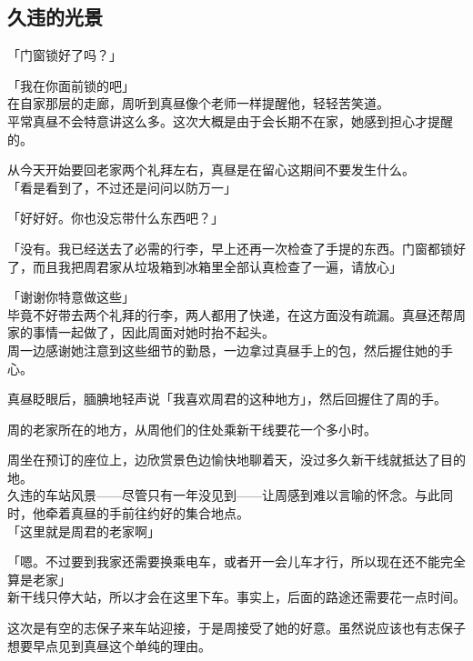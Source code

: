 \subsection{久违的光景}

「门窗锁好了吗？」

「我在你面前锁的吧」\\

在自家那层的走廊，周听到真昼像个老师一样提醒他，轻轻苦笑道。\\

平常真昼不会特意讲这么多。这次大概是由于会长期不在家，她感到担心才提醒的。

从今天开始要回老家两个礼拜左右，真昼是在留心这期间不要发生什么。\\

「看是看到了，不过还是问问以防万一」

「好好好。你也没忘带什么东西吧？」

「没有。我已经送去了必需的行李，早上还再一次检查了手提的东西。门窗都锁好了，而且我把周君家从垃圾箱到冰箱里全部认真检查了一遍，请放心」

「谢谢你特意做这些」\\

毕竟不好带去两个礼拜的行李，两人都用了快递，在这方面没有疏漏。真昼还帮周家的事情一起做了，因此周面对她时抬不起头。\\

周一边感谢她注意到这些细节的勤恳，一边拿过真昼手上的包，然后握住她的手心。

真昼眨眼后，腼腆地轻声说「我喜欢周君的这种地方」，然后回握住了周的手。\\

\vspace{2\baselineskip}

周的老家所在的地方，从周他们的住处乘新干线要花一个多小时。

周坐在预订的座位上，边欣赏景色边愉快地聊着天，没过多久新干线就抵达了目的地。\\

久违的车站风景——尽管只有一年没见到——让周感到难以言喻的怀念。与此同时，他牵着真昼的手前往约好的集合地点。\\

「这里就是周君的老家啊」

「嗯。不过要到我家还需要换乘电车，或者开一会儿车才行，所以现在还不能完全算是老家」\\

新干线只停大站，所以才会在这里下车。事实上，后面的路途还需要花一点时间。

这次是有空的志保子来车站迎接，于是周接受了她的好意。虽然说应该也有志保子想要早点见到真昼这个单纯的理由。\\

